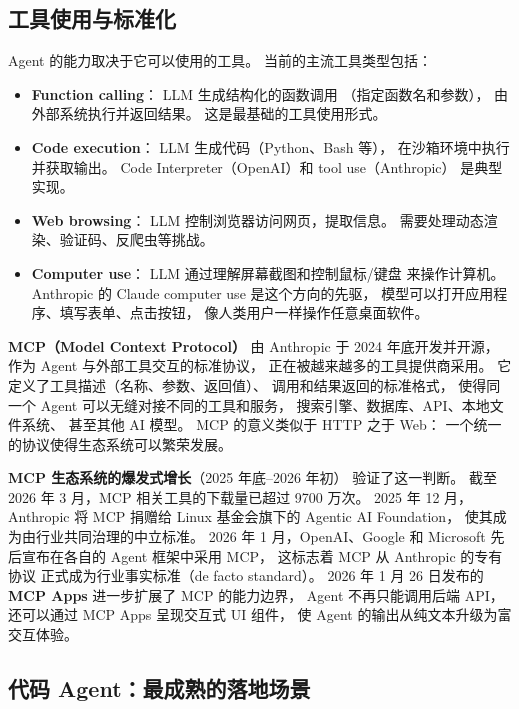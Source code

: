 \subsection{工具使用与标准化}

Agent 的能力取决于它可以使用的工具。
当前的主流工具类型包括：

\begin{itemize}[noitemsep]
  \item \textbf{Function calling}：
        LLM 生成结构化的函数调用
        （指定函数名和参数），
        由外部系统执行并返回结果。
        这是最基础的工具使用形式。
  \item \textbf{Code execution}：
        LLM 生成代码（Python、Bash 等），
        在沙箱环境中执行并获取输出。
        Code Interpreter（OpenAI）和 tool use（Anthropic）
        是典型实现。
  \item \textbf{Web browsing}：
        LLM 控制浏览器访问网页，提取信息。
        需要处理动态渲染、验证码、反爬虫等挑战。
  \item \textbf{Computer use}：
        LLM 通过理解屏幕截图和控制鼠标/键盘
        来操作计算机。
        Anthropic 的 Claude computer use 是这个方向的先驱，
        模型可以打开应用程序、填写表单、点击按钮，
        像人类用户一样操作任意桌面软件。
\end{itemize}

\textbf{MCP（Model Context Protocol）}
由 Anthropic 于 2024 年底开发并开源，
作为 Agent 与外部工具交互的标准协议，
正在被越来越多的工具提供商采用。
它定义了工具描述（名称、参数、返回值）、
调用和结果返回的标准格式，
使得同一个 Agent 可以无缝对接不同的工具和服务，
搜索引擎、数据库、API、本地文件系统、
甚至其他 AI 模型。
MCP 的意义类似于 HTTP 之于 Web：
一个统一的协议使得生态系统可以繁荣发展。

\textbf{MCP 生态系统的爆发式增长}（2025 年底--2026 年初）
验证了这一判断。
截至 2026 年 3 月，MCP 相关工具的下载量已超过 9700 万次。
2025 年 12 月，Anthropic 将 MCP 捐赠给
Linux 基金会旗下的 Agentic AI Foundation，
使其成为由行业共同治理的中立标准。
2026 年 1 月，OpenAI、Google 和 Microsoft
先后宣布在各自的 Agent 框架中采用 MCP，
这标志着 MCP 从 Anthropic 的专有协议
正式成为行业事实标准（de facto standard）。
2026 年 1 月 26 日发布的 \textbf{MCP Apps}
进一步扩展了 MCP 的能力边界，
Agent 不再只能调用后端 API，
还可以通过 MCP Apps 呈现交互式 UI 组件，
使 Agent 的输出从纯文本升级为富交互体验。

\subsection{代码 Agent：最成熟的落地场景}
\label{sec:code-agents}

